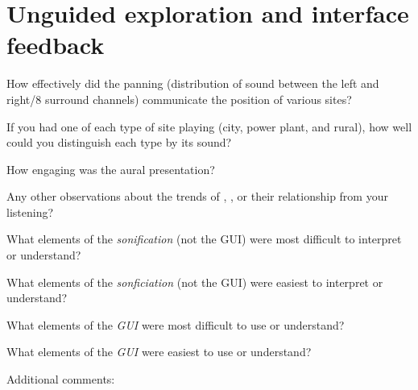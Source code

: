 \documentclass[12pt]{exam}
\begin{document}
\section*{Unguided exploration and interface feedback}
\begin{questions}


\question How effectively did the panning (distribution of sound between the left and right/8 surround channels) communicate the position of various sites?



\question If you had one of each type of site playing (city, power plant, and rural), how well could you distinguish each type by its sound?


\question How engaging was the aural presentation?

\question Any other observations about the trends of , , or their relationship from your listening?

\newpage
\question What elements of the \emph{sonification} (not the GUI) were most difficult to interpret or understand?

\question What elements of the \emph{sonficiation} (not the GUI) were easiest to interpret or understand?
\newpage

\newpage
\question What elements of the \emph{GUI} were most difficult to use or understand?

\question What elements of the \emph{GUI} were easiest to use or understand?
\newpage

\question Additional comments:
\newpage

\end{questions}
\end{document}
